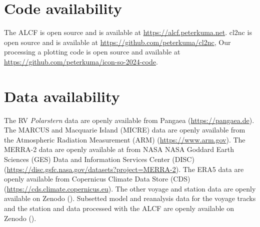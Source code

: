 \documentclass[12pt,a4paper]{article}
\begin{document}
\section*{Code availability}

The ALCF is open source and is available at \url{https://alcf.peterkuma.net}.
cl2nc is open source and is available at
\url{https://github.com/peterkuma/cl2nc}, Our processing a plotting code is
open source and available at
\url{https://github.com/peterkuma/icon-so-2024-code}.

\section*{Data availability}

The RV \emph{Polarstern} data are openly available from Pangaea
(\url{https://pangaea.de}). The MARCUS and Macquarie Island (MICRE) data are
openly available from the Atmospheric Radiation Measurement (ARM)
(\url{https://www.arm.gov}). The MERRA-2 data are openly available at from NASA
NASA Goddard Earth Sciences (GES) Data and Information Services Center (DISC)
(\url{https://disc.gsfc.nasa.gov/datasets?project=MERRA-2}).  The ERA5 data are
openly available from Copernicus Climate Data Store (CDS)
(\url{https://cds.climate.copernicus.eu}).  The other voyage and station data
are openly available on Zenodo (). Subsetted model and reanalysis data for the
voyage tracks and the station and data processed with the ALCF are openly
available on Zenodo ().

\footnotesize
\setlength{\bibsep}{0.0pt}

\end{document}

